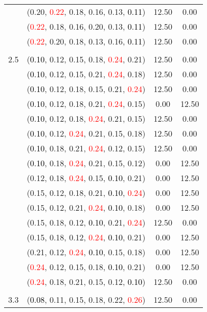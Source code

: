 \documentclass[10pt,a4paper]{report}
\begin{document}
\begin{center}
\begin{longtable}{clcc}
			&(0.20, \textcolor{red}{0.22}, 0.18, 0.16, 0.13, \textcolor{black}{0.11})&12.50&0.00\\
			&(\textcolor{red}{0.22}, 0.18, 0.16, 0.20, 0.13, \textcolor{black}{0.11})&12.50&0.00\\
			&(\textcolor{red}{0.22}, 0.20, 0.18, 0.13, 0.16, \textcolor{black}{0.11})&12.50&0.00\\
		&&&\\
		2.5			&(\textcolor{black}{0.10}, 0.12, 0.15, 0.18, \textcolor{red}{0.24}, 0.21)&12.50&0.00\\
			&(\textcolor{black}{0.10}, 0.12, 0.15, 0.21, \textcolor{red}{0.24}, 0.18)&12.50&0.00\\
			&(\textcolor{black}{0.10}, 0.12, 0.18, 0.15, 0.21, \textcolor{red}{0.24})&12.50&0.00\\
			&(\textcolor{black}{0.10}, 0.12, 0.18, 0.21, \textcolor{red}{0.24}, 0.15)&0.00&12.50\\
			&(\textcolor{black}{0.10}, 0.12, 0.18, \textcolor{red}{0.24}, 0.21, 0.15)&12.50&0.00\\
			&(\textcolor{black}{0.10}, 0.12, \textcolor{red}{0.24}, 0.21, 0.15, 0.18)&12.50&0.00\\
			&(\textcolor{black}{0.10}, 0.18, 0.21, \textcolor{red}{0.24}, 0.12, 0.15)&12.50&0.00\\
			&(\textcolor{black}{0.10}, 0.18, \textcolor{red}{0.24}, 0.21, 0.15, 0.12)&0.00&12.50\\
			&(0.12, 0.18, \textcolor{red}{0.24}, 0.15, \textcolor{black}{0.10}, 0.21)&0.00&12.50\\
			&(0.15, 0.12, 0.18, 0.21, \textcolor{black}{0.10}, \textcolor{red}{0.24})&0.00&12.50\\
			&(0.15, 0.12, 0.21, \textcolor{red}{0.24}, \textcolor{black}{0.10}, 0.18)&0.00&12.50\\
			&(0.15, 0.18, 0.12, \textcolor{black}{0.10}, 0.21, \textcolor{red}{0.24})&12.50&0.00\\
			&(0.15, 0.18, 0.12, \textcolor{red}{0.24}, \textcolor{black}{0.10}, 0.21)&0.00&12.50\\
			&(0.21, 0.12, \textcolor{red}{0.24}, \textcolor{black}{0.10}, 0.15, 0.18)&0.00&12.50\\
			&(\textcolor{red}{0.24}, 0.12, 0.15, 0.18, \textcolor{black}{0.10}, 0.21)&0.00&12.50\\
			&(\textcolor{red}{0.24}, 0.18, 0.21, 0.15, 0.12, \textcolor{black}{0.10})&12.50&0.00\\
		&&&\\
		3.3			&(\textcolor{black}{0.08}, 0.11, 0.15, 0.18, 0.22, \textcolor{red}{0.26})&12.50&0.00\\

\end{longtable}
\end{center}
\end{document}
